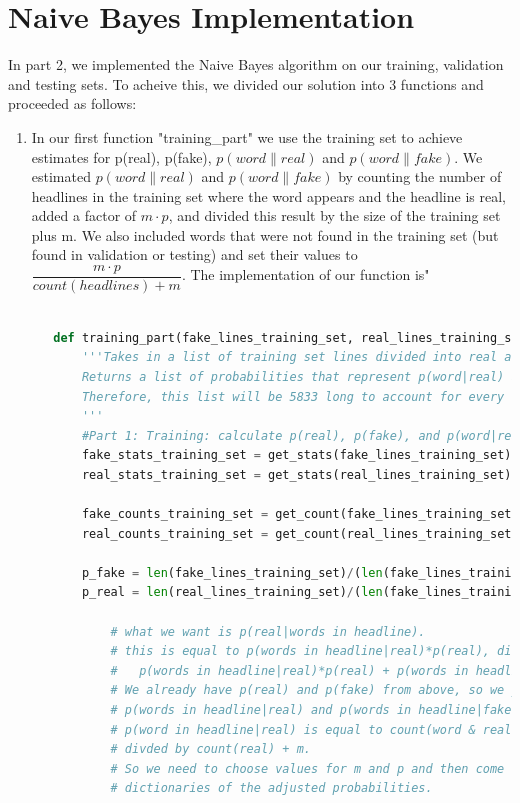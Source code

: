 \documentclass{article}
\begin{document}
   \section{Naive Bayes Implementation}
   In part 2, we implemented the Naive Bayes algorithm on our training, validation and testing sets.
   To acheive this, we divided our solution into 3 functions and proceeded as follows:
   \begin{enumerate}
   \item In our first function "training\_part" we use the training set to achieve estimates for p(real), p(fake), $p(word\|real)$ and $p(word\|fake)$. We estimated $ p(word\|real)$ and $p(word\|fake)$ by counting the number of
   headlines in the training set where the word appears and the headline is real, added a factor of $ m\cdot p$, and divided this result by the size of the training set plus m. We also included words that were not found in the
   training set (but found in validation or testing) and set their values to $ \dfrac {m \cdot p}{count(headlines) + m}$.
   The implementation of our function is"
   \begin{lstlisting}[language=Python]

   def training_part(fake_lines_training_set, real_lines_training_set, m, p):
       '''Takes in a list of training set lines divided into real and fake groups.
       Returns a list of probabilities that represent p(word|real) and p(word|fake).
       Therefore, this list will be 5833 long to account for every word.
       '''
       #Part 1: Training: calculate p(real), p(fake), and p(word|real), p(word|fake)
       fake_stats_training_set = get_stats(fake_lines_training_set) #compute probabilities for each word
       real_stats_training_set = get_stats(real_lines_training_set)

       fake_counts_training_set = get_count(fake_lines_training_set) #compute counts for each word
       real_counts_training_set = get_count(real_lines_training_set)

       p_fake = len(fake_lines_training_set)/(len(fake_lines_training_set) + len(real_lines_training_set))
       p_real = len(real_lines_training_set)/(len(fake_lines_training_set) + len(real_lines_training_set))

           # what we want is p(real|words in headline).
           # this is equal to p(words in headline|real)*p(real), divided by
           #   p(words in headline|real)*p(real) + p(words in headline|fake)*p(fake)
           # We already have p(real) and p(fake) from above, so we just need to find
           # p(words in headline|real) and p(words in headline|fake)
           # p(word in headline|real) is equal to count(word & real) + mp
           # divded by count(real) + m.
           # So we need to choose values for m and p and then come up with a
           # dictionaries of the adjusted probabilities.


\end{lstlisting}
\end{enumerate}
\end{document}
